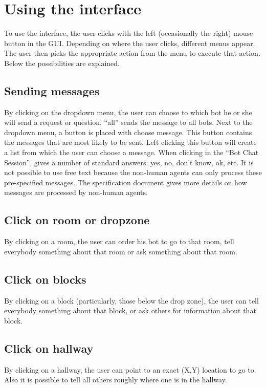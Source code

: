 \documentclass[11pt,a4paper]{article}
\begin{document}
\section{Using the interface}
To use the interface, the user clicks with the left (occasionally the right) mouse button in the GUI. Depending on where the user clicks, different menus appear. The user then picks the appropriate action from the menu to execute that action. Below the possibilities are explained.
\subsection{Sending messages}
By clicking on the dropdown menu, the user can choose to which bot he or she will send a request or question. “all” sends the message to all bots. Next to the dropdown menu, a button is placed with choose message. This button contains the messages that are most likely to be sent. Left clicking this button will create a list from which the user can choose a message. When clicking in the “Bot Chat Session”, gives a number of standard answers: yes, no, don't know, ok, etc. It is not possible to use free text because the non-human agents can only process these pre-specified messages. The specification document gives more details on how messages are processed by non-human agents.
\subsection{Click on room or dropzone}
By clicking on a room, the user can order his bot to go to that room, tell everybody something about that room or ask something about that room.
\subsection{Click on blocks}
By clicking on a block (particularly, those below the drop zone), the user can tell everybody something about that block, or ask others for information about that block.
\subsection{Click on hallway}
By clicking on a hallway, the user can point to an exact (X,Y) location to go to. Also it is possible to tell all others roughly where one is in the hallway.
\end{document}
